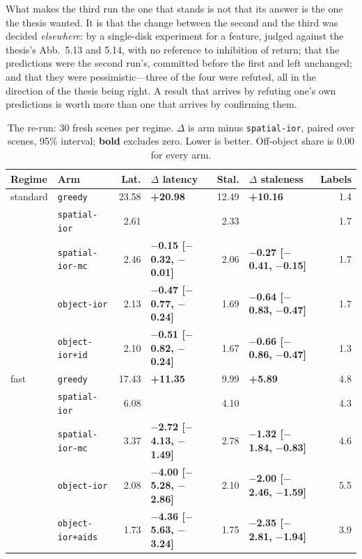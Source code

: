 \documentclass[11pt,a4paper]{article}
\newcommand{\arm}[1]{\texttt{#1}}
\newcommand{\sig}[1]{\textbf{#1}} %
\begin{document}
What makes the third run the one that stands is not that its answer is the one
the thesis wanted. It is that the change between the second and the third was
decided \emph{elsewhere}: by a single-disk experiment for a feature, judged
against the thesis's Abb.~5.13 and 5.14, with no reference to inhibition of
return; that the predictions were the second run's, committed before the first
and left unchanged; and that they were pessimistic---three of the four were
refuted, all in the direction of the thesis being right. A result that arrives by
refuting one's own predictions is worth more than one that arrives by confirming
them.

\begin{table}[t]
\caption{The re-run: 30 fresh scenes per regime. $\Delta$ is arm minus
\arm{spatial-ior}, paired over scenes, 95\% interval; \sig{bold} excludes zero.
Lower is better. Off-object share is 0.00 for every arm.}
\label{tab:h1}
\footnotesize
\begin{tabularx}{\linewidth}{@{}llrXrXr@{}}
\toprule
Regime & Arm & Lat. & $\Delta$ latency & Stal. & $\Delta$ staleness & Labels \\
\midrule
standard & \arm{greedy}          & 23.58 & \sig{+20.98} & 12.49 & \sig{+10.16} & 1.4 \\
         & \arm{spatial-ior}     &  2.61 &  &  2.33 &  & 1.7 \\
         & \arm{spatial-ior-mc}  &  2.46 & \sig{$-$0.15 [$-$0.32, $-$0.01]} & 2.06 & \sig{$-$0.27 [$-$0.41, $-$0.15]} & 1.7 \\
         & \arm{object-ior}      &  2.13 & \sig{$-$0.47 [$-$0.77, $-$0.24]} & 1.69 & \sig{$-$0.64 [$-$0.83, $-$0.47]} & 1.7 \\
         & \arm{object-ior+id}   &  2.10 & \sig{$-$0.51 [$-$0.82, $-$0.24]} & 1.67 & \sig{$-$0.66 [$-$0.86, $-$0.47]} & 1.3 \\
\addlinespace
fast     & \arm{greedy}          & 17.43 & \sig{+11.35} &  9.99 & \sig{+5.89} & 4.8 \\
         & \arm{spatial-ior}     &  6.08 &  &  4.10 &  & 4.3 \\
         & \arm{spatial-ior-mc}  &  3.37 & \sig{$-$2.72 [$-$4.13, $-$1.49]} & 2.78 & \sig{$-$1.32 [$-$1.84, $-$0.83]} & 4.6 \\
         & \arm{object-ior}      &  2.08 & \sig{$-$4.00 [$-$5.28, $-$2.86]} & 2.10 & \sig{$-$2.00 [$-$2.46, $-$1.59]} & 5.5 \\
         & \arm{object-ior+aids} &  1.73 & \sig{$-$4.36 [$-$5.63, $-$3.24]} & 1.75 & \sig{$-$2.35 [$-$2.81, $-$1.94]} & 3.9 \\

\end{tabularx}
\end{table}
\end{document}
